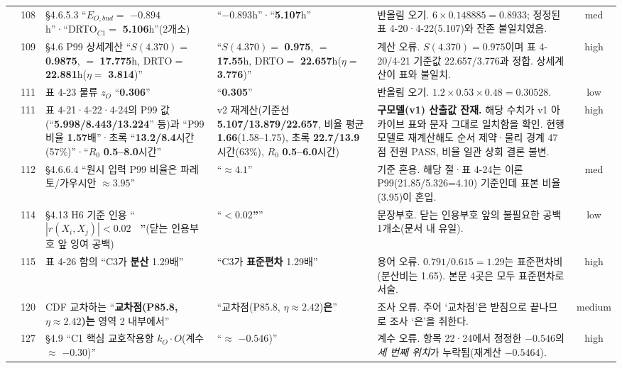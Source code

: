 \documentclass[11pt,a4paper]{article}
\newcommand{\err}[1]{{\color{errred}\textbf{#1}}}
\begin{document}
\begin{longtable}{@{}c c >{\RaggedRight}p{4.6cm} >{\RaggedRight}p{3.0cm} >{\RaggedRight}p{3.4cm} c@{}}
\addlinespace
28 & 108 & \S4.6.5.3 ``$E_{O,bnd}=$ \err{$-0.894$}h''·``DRTO$_{C1}=$ \err{5.106}h''(2개소) & ``\err{$-0.893$}h''·``\err{5.107}h'' & 반올림 오기. $6{\times}0.148885{=}0.8933$; 정정된 표 4-20·4-22(5.107)와 잔존 불일치였음. & med \\
\addlinespace
29 & 109 & \S4.6 P99 상세계산 ``$S(4.370)=$ \err{0.9875}, $=$ \err{17.775}h, DRTO$=$ \err{22.881}h($\eta=$ \err{3.814})'' & ``$S(4.370)=$ \err{0.975}, $=$ \err{17.55}h, DRTO$=$ \err{22.657}h($\eta=$ \err{3.776})'' & 계산 오류. $S(4.370)=0.975$이며 표 4-20/4-21 기준값 22.657/3.776과 정합. 상세계산이 표와 불일치. & high \\
\addlinespace
30 & 111 & 표 4-23 물류 $z_O$ ``\err{0.306}'' & ``\err{0.305}'' & 반올림 오기. $1.2{\times}0.53{\times}0.48=0.30528$. & low \\
\addlinespace
31 & 111 & 표 4-21·4-22·4-24의 P99 값(``\err{5.998/8.443/13.224}'' 등)과 ``P99 비율 \err{1.57}배''·초록 ``\err{13.2/8.4}시간(57\%)''·``$R_0$ \err{0.5--8.0}시간'' & v2 재계산(기준선 \err{5.107/13.879/22.657}, 비율 평균 \err{1.66}(1.58--1.75), 초록 \err{22.7/13.9}시간(63\%), $R_0$ \err{0.5--6.0}시간) & \textbf{구모델(v1) 산출값 잔재.} 해당 수치가 v1 아카이브 표와 문자 그대로 일치함을 확인. 현행 모델로 재계산해도 순서 제약·물리 경계 47점 전원 PASS, 비율 일관 상회 결론 불변. & high \\
\addlinespace
32 & 112 & \S4.6.6.4 ``원시 입력 P99 비율은 파레토/가우시안 \err{$\approx3.95$}'' & ``\err{$\approx4.1$}'' & 기준 혼용. 해당 절·표 4-24는 이론 P99(21.85/5.326=4.10) 기준인데 표본 비율(3.95)이 혼입. & med \\
\addlinespace
33 & 114 & \S4.13 H6 기준 인용 ``$|r(X_i,X_j)| < 0.02$ \err{~''}(닫는 인용부호 앞 잉여 공백) & ``$< 0.02$\err{''}'' & 문장부호. 닫는 인용부호 앞의 불필요한 공백 1개소(문서 내 유일). & low \\
\addlinespace
34 & 115 & 표 4-26 함의 ``C3가 \err{분산} 1.29배'' & ``C3가 \err{표준편차} 1.29배'' & 용어 오류. $0.791/0.615=1.29$는 표준편차비(분산비는 1.65). 본문 4곳은 모두 표준편차로 서술. & high \\
\addlinespace
35 & 120 & CDF 교차하는 ``\err{교차점(P85.8, $\eta \approx 2.42$)는} 영역 2 내부에서'' & ``교차점(P85.8, $\eta \approx 2.42$)\err{은}'' & 조사 오류. 주어 `교차점'은 받침으로 끝나므로 조사 `은'을 취한다. & medium \\
\addlinespace
36 & 127 & \S4.9 ``C1 핵심 교호작용항 $k_O\!\cdot\!O$(계수 $\approx$ \err{$-0.30$})'' & ``$\approx$ \err{$-0.546$})'' & 계수 오류. 항목 22·24에서 정정한 $-0.546$의 \emph{세 번째 위치}가 누락됨(재계산 $-0.5464$). & high \\

\end{longtable}
\end{document}
